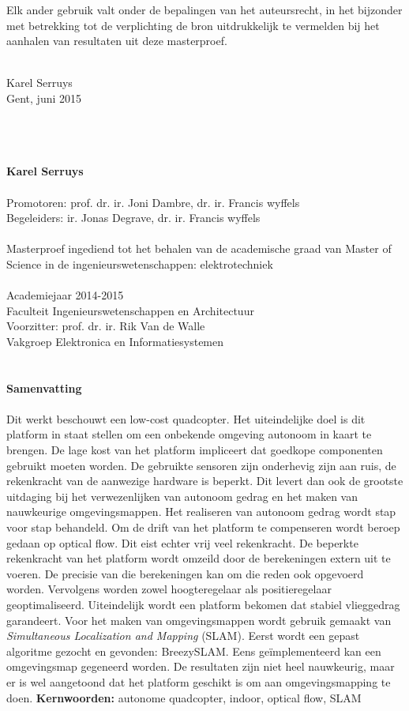 \npar Elk ander gebruik valt onder de bepalingen van het auteursrecht, in het bijzonder met betrekking tot de verplichting de bron uitdrukkelijk te vermelden bij het aanhalen van resultaten uit deze masterproef.\\
\\
\begin{flushright}
Karel Serruys\\
Gent, juni 2015
\end{flushright}

\newpage
\thispagestyle{empty}
\\
\\
\\
\textbf{Karel Serruys}\\
\\
Promotoren: prof. dr. ir. Joni Dambre, dr. ir. Francis wyffels\\
Begeleiders: ir. Jonas Degrave, dr. ir. Francis wyffels\\
\\
Masterproef ingediend tot het behalen van de academische graad van Master of Science in de ingenieurswetenschappen: elektrotechniek\\
\\
Academiejaar 2014-2015\\
Faculteit Ingenieurswetenschappen en Architectuur\\
Voorzitter: prof. dr. ir. Rik Van de Walle\\
Vakgroep Elektronica en Informatiesystemen\\
\\
\\
{\Large \textbf{Samenvatting}}\\
\\
Dit werkt beschouwt een low-cost quadcopter. Het uiteindelijke doel is dit platform in staat stellen om een onbekende omgeving autonoom in kaart te brengen. De lage kost van het platform impliceert dat goedkope componenten gebruikt moeten worden. De gebruikte sensoren zijn onderhevig zijn aan ruis, de rekenkracht van de aanwezige hardware is beperkt. Dit levert dan ook de grootste uitdaging bij het verwezenlijken van autonoom gedrag en het maken van nauwkeurige omgevingsmappen.
\npar Het realiseren van autonoom gedrag wordt stap voor stap behandeld. Om de drift van het platform te compenseren wordt beroep gedaan op optical flow. Dit eist echter vrij veel rekenkracht. De beperkte rekenkracht van het platform wordt omzeild door de berekeningen extern uit te voeren. De precisie van die berekeningen kan om die reden ook opgevoerd worden. Vervolgens worden zowel hoogteregelaar als positieregelaar geoptimaliseerd. Uiteindelijk wordt een platform bekomen dat stabiel vlieggedrag garandeert.
\npar Voor het maken van omgevingsmappen wordt gebruik gemaakt van \textit{Simultaneous Localization and Mapping} (SLAM). Eerst wordt een gepast algoritme gezocht en gevonden: {BreezySLAM}. Eens ge\"implementeerd kan een omgevingsmap gegeneerd worden. De resultaten zijn niet heel nauwkeurig, maar er is wel aangetoond dat het platform geschikt is om aan omgevingsmapping te doen.
\npar \textbf{Kernwoorden:} autonome quadcopter, indoor, optical flow, SLAM
